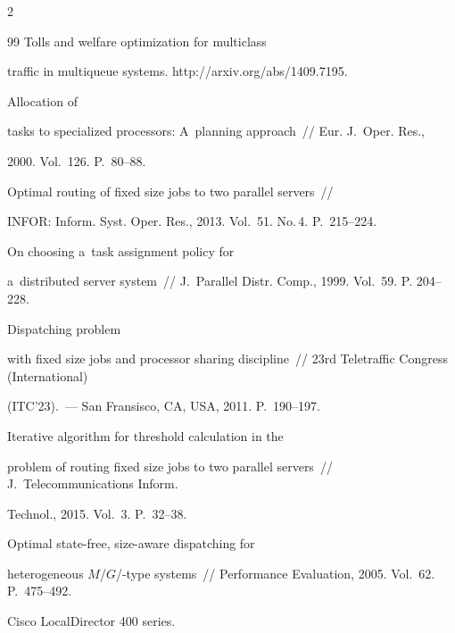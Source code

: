 \begin{multicols}{2}
{{\begin{thebibliography}{99}
     Tolls and welfare optimization for multiclass 


traffic in multiqueue systems. {\sf http://arxiv.org/abs/1409.7195}.




     Allocation of 


tasks to specialized processors: A~planning approach~// Eur. J.~Oper. Res., 


2000. Vol.~126. P.~80--88.




     Optimal routing of fixed size jobs to two parallel servers~// 


INFOR: Inform. Syst. Oper. Res., 2013. Vol.~51. No.\,4. P.~215--224.




     On choosing a~task assignment policy for 


a~distributed server system~// J.~Parallel Distr. Comp., 1999. Vol.~59. P. 204--228.




     Dispatching problem 


with fixed size jobs and processor sharing discipline~// 23rd Teletraffic Congress (International) 


(ITC'23).~--- San Fransisco, CA, USA, 2011. P.~190--197.




     Iterative algorithm for threshold calculation in the 


problem of routing fixed size jobs to two parallel servers~// J.~Telecommunications Inform. 


Technol., 2015. Vol.~3. P.~32--38.




     Optimal state-free, size-aware dispatching for 


heterogeneous $M$/$G$/-type systems~// Performance Evaluation, 2005. Vol.~62. P.~475--492.




    Cisco LocalDirector 400 series. {\sf 


}
\end{thebibliography}}}
\end{multicols}
